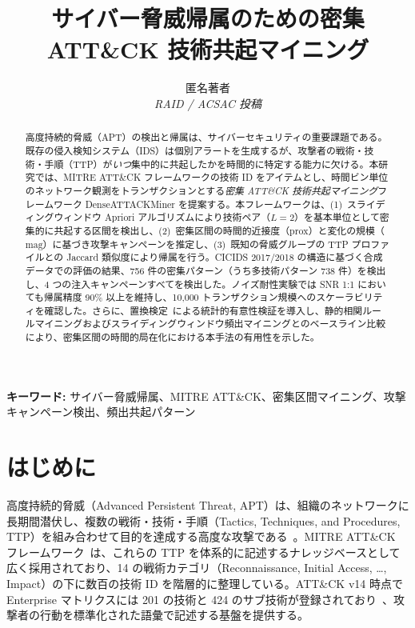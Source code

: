 \documentclass[11pt]{article}
\title{サイバー脅威帰属のための密集 ATT\&CK 技術共起マイニング}
\author{
  匿名著者\\
  \textit{RAID / ACSAC 投稿}
}
\date{}
\begin{document}
\maketitle

\begin{abstract}
高度持続的脅威（APT）の検出と帰属は、サイバーセキュリティの重要課題である。既存の侵入検知システム（IDS）は個別アラートを生成するが、攻撃者の戦術・技術・手順（TTP）が\emph{いつ}集中的に共起したかを時間的に特定する能力に欠ける。本研究では、MITRE ATT\&CK フレームワークの技術 ID をアイテムとし、時間ビン単位のネットワーク観測をトランザクションとする\emph{密集 ATT\&CK 技術共起マイニング}フレームワーク DenseATTACKMiner を提案する。本フレームワークは、(1)~スライディングウィンドウ Apriori アルゴリズムにより技術ペア（$L=2$）を基本単位として密集的に共起する区間を検出し、(2)~密集区間の時間的近接度（$\mathrm{prox}$）と変化の規模（$\mathrm{mag}$）に基づき攻撃キャンペーンを推定し、(3)~既知の脅威グループの TTP プロファイルとの Jaccard 類似度により帰属を行う。CICIDS 2017/2018 の構造に基づく合成データでの評価の結果、756 件の密集パターン（うち多技術パターン 738 件）を検出し、4 つの注入キャンペーンすべてを検出した。ノイズ耐性実験では SNR 1:1 においても帰属精度 90\% 以上を維持し、10{,}000 トランザクション規模へのスケーラビリティを確認した。さらに、置換検定~\cite{lancaster2018surrogate}による統計的有意性検証を導入し、静的相関ルールマイニングおよびスライディングウィンドウ頻出マイニングとのベースライン比較により、密集区間の時間的局在化における本手法の有用性を示した。
\end{abstract}

\noindent\textbf{キーワード:} サイバー脅威帰属、MITRE ATT\&CK、密集区間マイニング、攻撃キャンペーン検出、頻出共起パターン

\section{はじめに}\label{sec:intro}

高度持続的脅威（Advanced Persistent Threat, APT）は、組織のネットワークに長期間潜伏し、複数の戦術・技術・手順（Tactics, Techniques, and Procedures, TTP）を組み合わせて目的を達成する高度な攻撃である~\cite{hutchins2011intelligence}。MITRE ATT\&CK フレームワーク~\cite{strom2018mitre}は、これらの TTP を体系的に記述するナレッジベースとして広く採用されており、14 の戦術カテゴリ（Reconnaissance, Initial Access, \ldots, Impact）の下に数百の技術 ID を階層的に整理している。ATT\&CK v14 時点で Enterprise マトリクスには 201 の技術と 424 のサブ技術が登録されており~\cite{strom2018mitre}、攻撃者の行動を標準化された語彙で記述する基盤を提供する。
\end{document}
